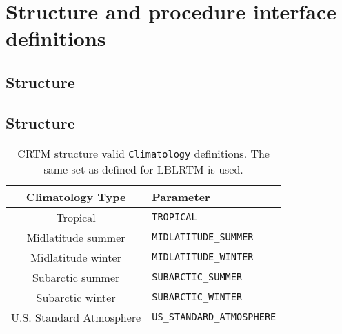 \chapter{Structure and procedure interface definitions}

\clearpage
\section{\ChannelInfo{} Structure}
\label{sec:channelinfo_structure}













\clearpage
\section{\Atmosphere{} Structure}
\label{sec:atmosphere_structure}



\begin{table}[htp]
  \centering
  \begin{tabular}{c l}
    \hline
    \sffamily\textbf{Climatology Type} & \sffamily\textbf{Parameter} \\
    \hline\hline
             Tropical          &  \texttt{TROPICAL}\\              
        Midlatitude summer     &  \texttt{MIDLATITUDE\_SUMMER}\\
        Midlatitude winter     &  \texttt{MIDLATITUDE\_WINTER}\\
         Subarctic summer      &  \texttt{SUBARCTIC\_SUMMER}\\
         Subarctic winter      &  \texttt{SUBARCTIC\_WINTER}\\
     U.S. Standard Atmosphere  &  \texttt{US\_STANDARD\_ATMOSPHERE}\\
    \hline 
  \end{tabular}
  \caption{CRTM \Atmosphere{} structure valid \texttt{Climatology} definitions. The same set as defined for LBLRTM is used.}
  \label{tab:climatology}
\end{table}

